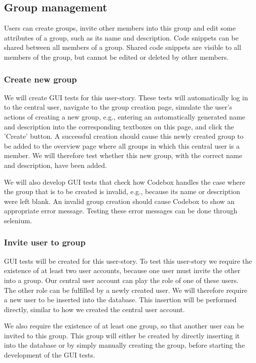 \documentclass[10pt,a4paper,BCOR12mm, headexclude, footexclude,
  twoside, openright]{scrartcl}
\numberwithin{equation}{section} %
\numberwithin{figure}{section} %
\numberwithin{table}{section} %
\begin{document}
\subsection{Group management}

Users can create groups, invite other members into this group and edit some attributes of a group, such as its name and description.
Code snippets can be shared between all members of a group. Shared code snippets are visible to all members of the group, but cannot be edited or deleted by other members.

\subsubsection*{Create new group}

We will create GUI tests for this user-story. These tests will automatically log in to the central user, navigate to the group creation page, simulate the user's actions of creating a new group, e.g., entering an automatically generated name and description into the corresponding textboxes on this page, and click the 'Create' button.
A successful creation should cause this newly created group to be added to the overview page where all groups in which this central user is a member.
We will therefore test whether this new group, with the correct name and description, have been added.

We will also develop GUI tests that check how Codebox handles the case where the group that is to be created is invalid, e.g., because its name or description were left blank.
An invalid group creation should cause Codebox to show an appropriate error message. Testing these error messages can be done through selenium.

\subsubsection*{Invite user to group}

GUI tests will be created for this user-story.
To test this user-story we require the existence of at least two user accounts, because one user must invite the other into a group.
Our central user account can play the role of one of these users. The other role can be fulfilled by a newly created user.
We will therefore require a new user to be inserted into the database. This insertion will be performed directly, similar to how we created the central user account.

We also require the existence of at least one group, so that another user can be invited to this group. This group will either be created by directly inserting it into the database or by simply manually creating the group, before starting the development of the GUI tests.
\end{document}
